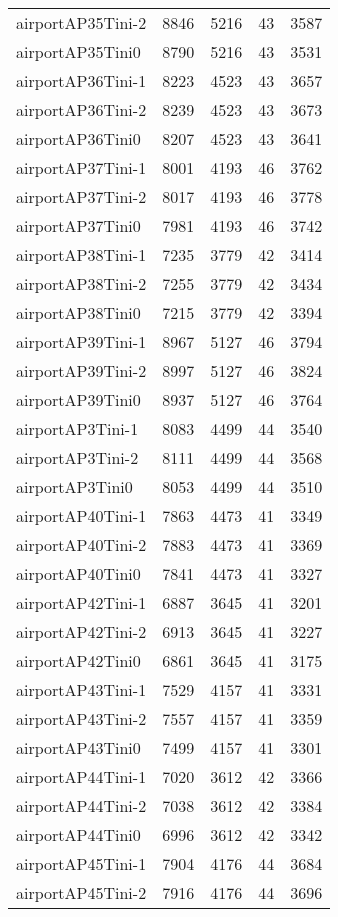 \begin{longtable}{lrrrr}
airportAP35Tini-2 & 8846 & 5216 & 43 & 3587 \\
airportAP35Tini0 & 8790 & 5216 & 43 & 3531 \\
airportAP36Tini-1 & 8223 & 4523 & 43 & 3657 \\
airportAP36Tini-2 & 8239 & 4523 & 43 & 3673 \\
airportAP36Tini0 & 8207 & 4523 & 43 & 3641 \\
airportAP37Tini-1 & 8001 & 4193 & 46 & 3762 \\
airportAP37Tini-2 & 8017 & 4193 & 46 & 3778 \\
airportAP37Tini0 & 7981 & 4193 & 46 & 3742 \\
airportAP38Tini-1 & 7235 & 3779 & 42 & 3414 \\
airportAP38Tini-2 & 7255 & 3779 & 42 & 3434 \\
airportAP38Tini0 & 7215 & 3779 & 42 & 3394 \\
airportAP39Tini-1 & 8967 & 5127 & 46 & 3794 \\
airportAP39Tini-2 & 8997 & 5127 & 46 & 3824 \\
airportAP39Tini0 & 8937 & 5127 & 46 & 3764 \\
airportAP3Tini-1 & 8083 & 4499 & 44 & 3540 \\
airportAP3Tini-2 & 8111 & 4499 & 44 & 3568 \\
airportAP3Tini0 & 8053 & 4499 & 44 & 3510 \\
airportAP40Tini-1 & 7863 & 4473 & 41 & 3349 \\
airportAP40Tini-2 & 7883 & 4473 & 41 & 3369 \\
airportAP40Tini0 & 7841 & 4473 & 41 & 3327 \\
airportAP42Tini-1 & 6887 & 3645 & 41 & 3201 \\
airportAP42Tini-2 & 6913 & 3645 & 41 & 3227 \\
airportAP42Tini0 & 6861 & 3645 & 41 & 3175 \\
airportAP43Tini-1 & 7529 & 4157 & 41 & 3331 \\
airportAP43Tini-2 & 7557 & 4157 & 41 & 3359 \\
airportAP43Tini0 & 7499 & 4157 & 41 & 3301 \\
airportAP44Tini-1 & 7020 & 3612 & 42 & 3366 \\
airportAP44Tini-2 & 7038 & 3612 & 42 & 3384 \\
airportAP44Tini0 & 6996 & 3612 & 42 & 3342 \\
airportAP45Tini-1 & 7904 & 4176 & 44 & 3684 \\
airportAP45Tini-2 & 7916 & 4176 & 44 & 3696 \\

\end{longtable}
